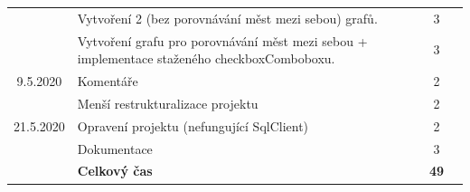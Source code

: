 \documentclass[12pt, a4paper]{article}
\begin{document}
\begin{table}[h!]
\begin{center}
\begin{tabular}{| cp{10cm} |c | c |}
& Vytvoření 2 (bez porovnávání měst mezi sebou) grafů. & 3 \\
& Vytvoření grafu pro porovnávání měst mezi sebou + implementace staženého checkboxComboboxu. & 3 \\
\hline
9.5.2020 & Komentáře & 2 \\
& Menší restrukturalizace projektu & 2 \\
\hline
21.5.2020 & Opravení projektu (nefungující SqlClient) & 2 \\
& Dokumentace & 3 \\
\hline
& \textbf{Celkový čas} & \textbf{49} \\
\hline
\end{tabular}
\end{center}
\end{table}
\end{document}
